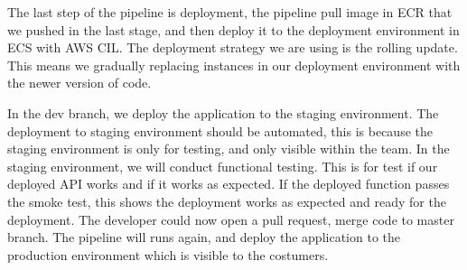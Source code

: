 \par
\label{deploy}
The last step of the pipeline is deployment, the pipeline pull image in ECR that we pushed in the last stage, and then deploy it to the deployment environment in ECS with AWS CIL. The deployment strategy we are using is the rolling update. This means we gradually replacing instances in our deployment environment with the newer version of code.
\par
In the dev branch, we deploy the application to the staging environment. The deployment to staging environment should be automated, this is because the staging environment is only for testing, and only visible within the team. 
In the staging environment, we will conduct functional testing. This is for test if our deployed API works and if it works as expected. If the deployed function passes the smoke test, this shows the deployment works as expected and ready for the deployment. The developer could now open a pull request, merge code to master branch. The pipeline will runs again, and deploy the application to the production environment which is visible to the costumers.

